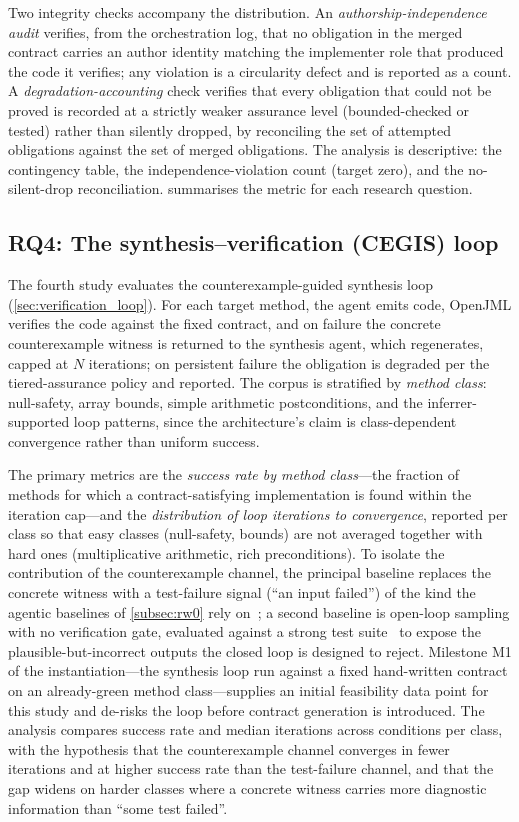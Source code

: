 Two integrity checks accompany the distribution. An \emph{authorship-independence audit} verifies, from the orchestration log, that no obligation in the merged contract carries an author identity matching the implementer role that produced the code it verifies; any violation is a circularity defect and is reported as a count. A \emph{degradation-accounting} check verifies that every obligation that could not be proved is recorded at a strictly weaker assurance level (bounded-checked or tested) rather than silently dropped, by reconciling the set of attempted obligations against the set of merged obligations. The analysis is descriptive: the contingency table, the independence-violation count (target zero), and the no-silent-drop reconciliation.  summarises the metric for each research question.

\subsection{RQ4: The synthesis--verification (CEGIS) loop}\label{subsec:eval_rq4}

The fourth study evaluates the counterexample-guided synthesis loop (\cref{sec:verification_loop}). For each target method, the agent emits code, OpenJML verifies the code against the fixed contract, and on failure the concrete counterexample witness is returned to the synthesis agent, which regenerates, capped at $N$ iterations; on persistent failure the obligation is degraded per the tiered-assurance policy and reported. The corpus is stratified by \emph{method class}: null-safety, array bounds, simple arithmetic postconditions, and the inferrer-supported loop patterns, since the architecture's claim is class-dependent convergence rather than uniform success.

The primary metrics are the \emph{success rate by method class}---the fraction of methods for which a contract-satisfying implementation is found within the iteration cap---and the \emph{distribution of loop iterations to convergence}, reported per class so that easy classes (null-safety, bounds) are not averaged together with hard ones (multiplicative arithmetic, rich preconditions). To isolate the contribution of the counterexample channel, the principal baseline replaces the concrete witness with a test-failure signal (``an input failed'') of the kind the agentic baselines of \cref{subsec:rw0} rely on~\cite{shinn2023reflexion,chen2024selfdebug}; a second baseline is open-loop sampling with no verification gate, evaluated against a strong test suite~\cite{liu2023evalplus} to expose the plausible-but-incorrect outputs the closed loop is designed to reject. Milestone M1 of the instantiation---the synthesis loop run against a fixed hand-written contract on an already-green method class---supplies an initial feasibility data point for this study and de-risks the loop before contract generation is introduced. The analysis compares success rate and median iterations across conditions per class, with the hypothesis that the counterexample channel converges in fewer iterations and at higher success rate than the test-failure channel, and that the gap widens on harder classes where a concrete witness carries more diagnostic information than ``some test failed''.

